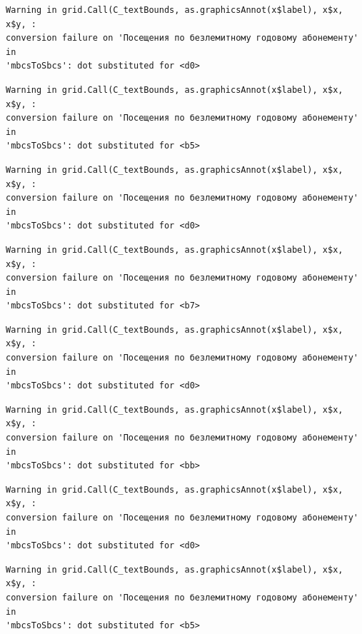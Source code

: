 \documentclass[
  letterpaper,
  DIV=11,
  numbers=noendperiod]{scrartcl}
\begin{document}
\begin{verbatim}
Warning in grid.Call(C_textBounds, as.graphicsAnnot(x$label), x$x, x$y, :
conversion failure on 'Посещения по безлемитному годовому абонементу' in
'mbcsToSbcs': dot substituted for <d0>
\end{verbatim}

\begin{verbatim}
Warning in grid.Call(C_textBounds, as.graphicsAnnot(x$label), x$x, x$y, :
conversion failure on 'Посещения по безлемитному годовому абонементу' in
'mbcsToSbcs': dot substituted for <b5>
\end{verbatim}

\begin{verbatim}
Warning in grid.Call(C_textBounds, as.graphicsAnnot(x$label), x$x, x$y, :
conversion failure on 'Посещения по безлемитному годовому абонементу' in
'mbcsToSbcs': dot substituted for <d0>
\end{verbatim}

\begin{verbatim}
Warning in grid.Call(C_textBounds, as.graphicsAnnot(x$label), x$x, x$y, :
conversion failure on 'Посещения по безлемитному годовому абонементу' in
'mbcsToSbcs': dot substituted for <b7>
\end{verbatim}

\begin{verbatim}
Warning in grid.Call(C_textBounds, as.graphicsAnnot(x$label), x$x, x$y, :
conversion failure on 'Посещения по безлемитному годовому абонементу' in
'mbcsToSbcs': dot substituted for <d0>
\end{verbatim}

\begin{verbatim}
Warning in grid.Call(C_textBounds, as.graphicsAnnot(x$label), x$x, x$y, :
conversion failure on 'Посещения по безлемитному годовому абонементу' in
'mbcsToSbcs': dot substituted for <bb>
\end{verbatim}

\begin{verbatim}
Warning in grid.Call(C_textBounds, as.graphicsAnnot(x$label), x$x, x$y, :
conversion failure on 'Посещения по безлемитному годовому абонементу' in
'mbcsToSbcs': dot substituted for <d0>
\end{verbatim}

\begin{verbatim}
Warning in grid.Call(C_textBounds, as.graphicsAnnot(x$label), x$x, x$y, :
conversion failure on 'Посещения по безлемитному годовому абонементу' in
'mbcsToSbcs': dot substituted for <b5>
\end{verbatim}
\end{document}

